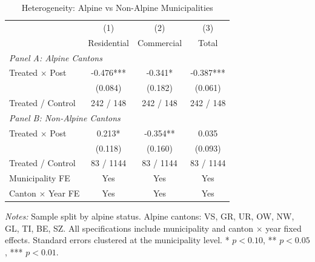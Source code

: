 \begin{table}[H]
\centering
\caption{Heterogeneity: Alpine vs Non-Alpine Municipalities}
\label{tab:heterogeneity}
\begin{threeparttable}
\begin{tabular}{lccc}
\toprule
 & (1) & (2) & (3) \\
 & Residential & Commercial & Total \\
\midrule
\multicolumn{4}{l}{\textit{Panel A: Alpine Cantons}} \\
[0.3em]
Treated $\times$ Post & -0.476*** & -0.341* & -0.387*** \\
 & (0.084) & (0.182) & (0.061) \\
Treated / Control & 242 / 148 & 242 / 148 & 242 / 148 \\
[0.5em]
\multicolumn{4}{l}{\textit{Panel B: Non-Alpine Cantons}} \\
[0.3em]
Treated $\times$ Post & 0.213* & -0.354** & 0.035 \\
 & (0.118) & (0.160) & (0.093) \\
Treated / Control & 83 / 1144 & 83 / 1144 & 83 / 1144 \\
\midrule
Municipality FE & Yes & Yes & Yes \\
Canton $\times$ Year FE & Yes & Yes & Yes \\
\bottomrule
\end{tabular}
\begin{tablenotes}[flushleft]
\small
\item \textit{Notes:} Sample split by alpine status. Alpine cantons: VS, GR, UR, OW, NW, GL, TI, BE, SZ. All specifications include municipality and canton $\times$ year fixed effects. Standard errors clustered at the municipality level. * $p<0.10$, ** $p<0.05$, *** $p<0.01$.
\end{tablenotes}
\end{threeparttable}
\end{table}

